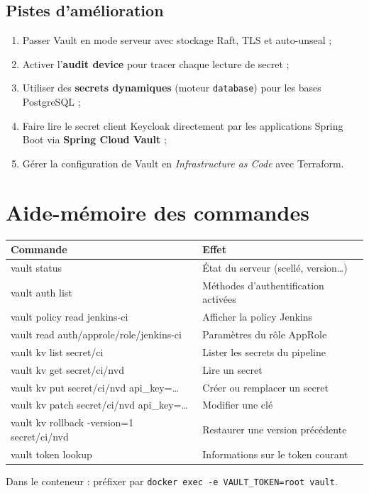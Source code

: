 \documentclass[11pt,a4paper]{article}
\begin{document}
\subsection{Pistes d'amélioration}

\begin{enumerate}[leftmargin=*]
  \item Passer Vault en mode serveur avec stockage Raft, TLS et auto-unseal ;
  \item Activer l'\textbf{audit device} pour tracer chaque lecture de secret ;
  \item Utiliser des \textbf{secrets dynamiques} (moteur \texttt{database}) pour les
        bases PostgreSQL ;
  \item Faire lire le secret client Keycloak directement par les applications Spring
        Boot via \textbf{Spring Cloud Vault} ;
  \item Gérer la configuration de Vault en \emph{Infrastructure as Code} avec Terraform.
\end{enumerate}

\appendix
\section{Aide-mémoire des commandes}

\begin{center}
\small
\begin{tabularx}{\linewidth}{>{\ttfamily\raggedright\arraybackslash}p{8.6cm} X}
\toprule
\textrm{\textbf{Commande}} & \textbf{Effet} \\
\midrule
vault status                               & État du serveur (scellé, version\ldots) \\
vault auth list                            & Méthodes d'authentification activées \\
vault policy read jenkins-ci               & Afficher la policy Jenkins \\
vault read auth/approle/role/jenkins-ci    & Paramètres du rôle AppRole \\
vault kv list secret/ci                    & Lister les secrets du pipeline \\
vault kv get secret/ci/nvd                 & Lire un secret \\
vault kv put secret/ci/nvd api\_key=\ldots  & Créer ou remplacer un secret \\
vault kv patch secret/ci/nvd api\_key=\ldots & Modifier une clé \\
vault kv rollback -version=1 secret/ci/nvd & Restaurer une version précédente \\
vault token lookup                         & Informations sur le token courant \\
\bottomrule
\end{tabularx}
\end{center}

\noindent Dans le conteneur : préfixer par
\texttt{docker exec -e VAULT\_TOKEN=root vault}.
\end{document}
